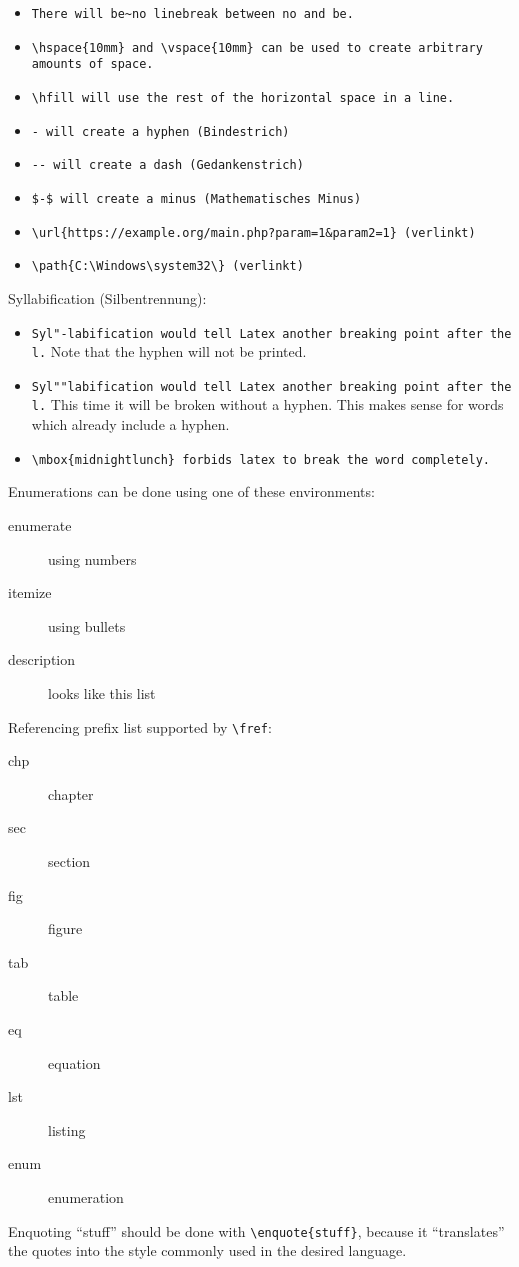 \begin{itemize}
\item \verb|There will be~no linebreak between no and be.|
\item \verb|\hspace{10mm} and \vspace{10mm} can be used to create arbitrary amounts of space.|
\item \verb|\hfill will use the rest of the horizontal space in a line.|
\item \verb|- will create a hyphen (Bindestrich)|
\item \verb|-- will create a dash (Gedankenstrich)|
\item \verb|$-$ will create a minus (Mathematisches Minus)|
\item \verb|\url{https://example.org/main.php?param=1&param2=1} (verlinkt)|
\item \verb|\path{C:\Windows\system32\} (verlinkt)|
\end{itemize}

\vspace{5mm}
Syllabification (Silbentrennung):
\begin{itemize}
\item \verb|Syl"-labification would tell Latex another breaking point after the l.| Note that the hyphen will not be printed.
\item \verb|Syl""labification would tell Latex another breaking point after the l.| This time it will be broken without a hyphen. This makes sense for words which already include a hyphen.
\item \verb|\mbox{midnightlunch} forbids latex to break the word completely.|
\end{itemize}

\vspace{5mm}
Enumerations can be done using one of these environments:
\begin{description}
\item[enumerate] using numbers
\item[itemize] using bullets
\item[description] looks like this list
\end{description}

\vspace{5mm}
Referencing prefix list supported by \verb|\fref|:
\begin{description}
\item[chp] chapter
\item[sec] section
\item[fig] figure
\item[tab] table
\item[eq] equation
\item[lst] listing
\item[enum] enumeration
\end{description}

\vspace{5mm}
Enquoting \enquote{stuff} should be done with \verb|\enquote{stuff}|, because it \enquote{translates} the quotes into the style commonly used in the desired language.



